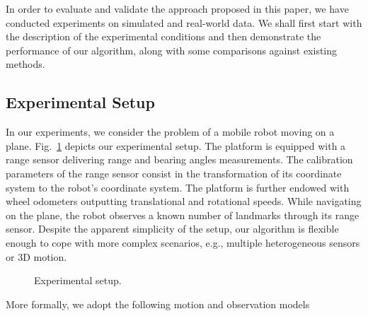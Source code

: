 In order to evaluate and validate the approach proposed in this paper, we have
conducted experiments on simulated and real-world data. We shall first start
with the description of the experimental conditions and then demonstrate the
performance of our algorithm, along with some comparisons against existing
methods.

\subsection{Experimental Setup}

In our experiments, we consider the problem of a mobile robot moving on a plane.
Fig.~\ref{fig:exp_setup} depicts our experimental setup. The platform is
equipped with a range sensor delivering range and bearing angles measurements.
The calibration parameters of the range sensor consist in the transformation of
its coordinate system to the robot's coordinate system. The platform is further
endowed with wheel odometers outputting translational and rotational speeds.
While navigating on the plane, the robot observes a known number of landmarks
through its range sensor. Despite the apparent simplicity of the setup, our
algorithm is flexible enough to cope with more complex scenarios, e.g., multiple
heterogeneous sensors or 3D motion.

\begin{figure}[t]
\centering
{}
\caption{Experimental setup.}
\label{fig:exp_setup}
\end{figure}

More formally, we adopt the following motion and observation models

